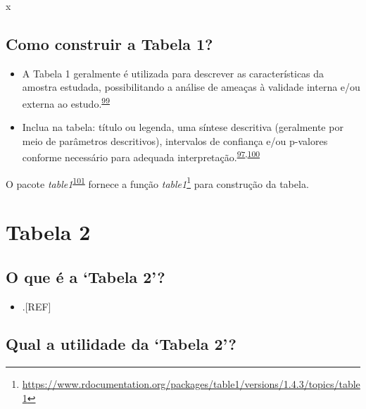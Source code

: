 \documentclass[
  a4paper,
]{book}
\providecommand{\tightlist}{%
  \setlength{\itemsep}{0pt}\setlength{\parskip}{0pt}}
\renewcommand{\href}[2]{#2\footnote{\url{#1}}}
\newenvironment{infobox}[1]
  {
  \begin{itemize}
  \renewcommand{\labelitemi}{
    \raisebox{-.7\height}[0pt][0pt]{
      {\setkeys{Gin}{width=3em,keepaspectratio}
        \texttt{[image: \#1]}}
    }
  }
  \setlength{\fboxsep}{1em}
  \begin{blackbox}
  \item
  }
  {
  \end{blackbox}
  \end{itemize}
  }
\begin{document}
x

\hypertarget{como-construir-a-tabela-1}{%
\subsection{Como construir a Tabela 1?}\label{como-construir-a-tabela-1}}

\begin{itemize}
\item
  A Tabela 1 geralmente é utilizada para descrever as características da amostra estudada, possibilitando a análise de ameaças à validade interna e/ou externa ao estudo.\textsuperscript{\protect\hyperlink{ref-Hayes-Larson2019}{99}}
\item
  Inclua na tabela: título ou legenda, uma síntese descritiva (geralmente por meio de parâmetros descritivos), intervalos de confiança e/ou p-valores conforme necessário para adequada interpretação.\textsuperscript{\protect\hyperlink{ref-Inskip2017}{97},\protect\hyperlink{ref-Kwak2021}{100}}
\end{itemize}

\begin{infobox}{images/Rlogo}
O pacote \emph{table1}\textsuperscript{\protect\hyperlink{ref-table1}{101}} fornece a função \href{https://www.rdocumentation.org/packages/table1/versions/1.4.3/topics/table1}{\emph{table1}} para construção da tabela.

\end{infobox}

\hypertarget{tabela-2}{%
\section{Tabela 2}\label{tabela-2}}

\hypertarget{o-que-uxe9-a-tabela-2}{%
\subsection{O que é a `Tabela 2'?}\label{o-que-uxe9-a-tabela-2}}

\begin{itemize}
\tightlist
\item
  .{[}REF{]}
\end{itemize}

\hypertarget{qual-a-utilidade-da-tabela-2}{%
\subsection{Qual a utilidade da `Tabela 2'?}\label{qual-a-utilidade-da-tabela-2}}
\end{document}
